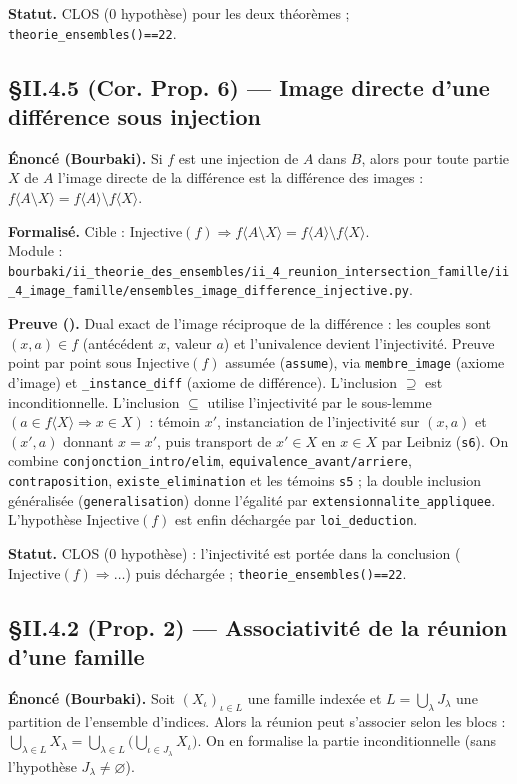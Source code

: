 \textbf{Statut.} CLOS (0 hypothèse) pour les deux théorèmes ; \texttt{theorie\_ensembles()==22}.


\subsection{§II.4.5 (Cor. Prop. 6) --- Image directe d'une différence sous injection}
\textbf{Énoncé (Bourbaki).} Si $f$ est une injection de $A$ dans $B$, alors pour toute partie $X$ de $A$
l'image directe de la différence est la différence des images : $f\langle A \setminus X\rangle =
f\langle A\rangle \setminus f\langle X\rangle$.

\textbf{Formalisé.} Cible : $\mathrm{Injective}(f) \Rightarrow f\langle A \setminus X\rangle =
f\langle A\rangle \setminus f\langle X\rangle$. \\
Module : \texttt{bourbaki/ii\_theorie\_des\_ensembles/ii\_4\_reunion\_intersection\_famille/ii\_4\_image\_famille/ensembles\_image\_difference\_injective.py}.

\textbf{Preuve (\Nstar).} Dual exact de l'image réciproque de la différence : les couples sont $(x,a)\in f$
(antécédent $x$, valeur $a$) et l'univalence devient l'injectivité. Preuve point par point sous
$\mathrm{Injective}(f)$ assumée (\texttt{assume}), via \texttt{membre\_image} (axiome d'image) et
\texttt{\_instance\_diff} (axiome de différence). L'inclusion $\supseteq$ est inconditionnelle. L'inclusion
$\subseteq$ utilise l'injectivité par le sous-lemme $(a\in f\langle X\rangle \Rightarrow x\in X)$ :
témoin $x'$, instanciation de l'injectivité sur $(x,a)$ et $(x',a)$ donnant $x=x'$, puis transport de
$x'\in X$ en $x\in X$ par Leibniz (\texttt{s6}). On combine \texttt{conjonction\_intro/elim},
\texttt{equivalence\_avant/arriere}, \texttt{contraposition}, \texttt{existe\_elimination} et les témoins
\texttt{s5} ; la double inclusion généralisée (\texttt{generalisation}) donne l'égalité par
\texttt{extensionnalite\_appliquee}. L'hypothèse $\mathrm{Injective}(f)$ est enfin déchargée par
\texttt{loi\_deduction}.

\textbf{Statut.} CLOS (0 hypothèse) : l'injectivité est portée dans la conclusion ($\mathrm{Injective}(f)
\Rightarrow \dots$) puis déchargée ; \texttt{theorie\_ensembles()==22}.


\subsection{§II.4.2 (Prop. 2) --- Associativité de la réunion d'une famille}
\textbf{Énoncé (Bourbaki).} Soit $(X_\iota)_{\iota\in L}$ une famille indexée et $L = \bigcup_\lambda J_\lambda$
une partition de l'ensemble d'indices. Alors la réunion peut s'associer selon les blocs :
$\bigcup_{\lambda\in L} X_\lambda = \bigcup_{\lambda\in L}\bigl(\bigcup_{\iota\in J_\lambda} X_\iota\bigr)$.
On en formalise la partie inconditionnelle (sans l'hypothèse $J_\lambda \neq \varnothing$).


